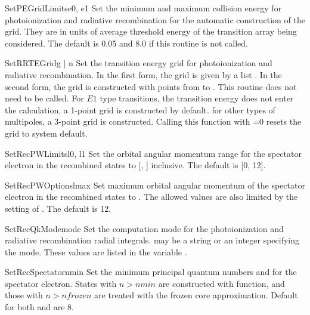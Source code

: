 \begin{fundesc}{SetPEGridLimits}{e0, e1}
Set the minimum and maximum collision energy for photoionization and radiative
recombination for the automatic construction of the grid. They are in units of
average threshold energy of the transition array being considered. The default
is 0.05 and 8.0 if this routine is not called.
\end{fundesc}

\begin{fundesc}{SetRRTEGrid}{g $\mid$ n}
Set the transition energy grid for photoionization and radiative recombination.
In the first form, the grid is given by a list . In the second form, the
grid is constructed with  points from  to . This routine
does not need to be called. For $E1$ type transitions, the transition energy
does not enter the calculation, a 1-point grid is constructed by default. for
other types of multipoles, a 3-point grid is constructed. Calling this function
with =0 resets the grid to system default.
\end{fundesc}

\begin{fundesc}{SetRecPWLimits}{l0, l1}
Set the orbital angular momentum range for the spectator electron in the
recombined states to [, ] inclusive. The default is [0, 12].
\end{fundesc}

\begin{fundesc}{SetRecPWOptions}{lmax}
Set maximum orbital angular momentum of the spectator electron in the
recombined states to . The allowed values are also limited by the
setting of . The default is 12.
\end{fundesc}

\begin{fundesc}{SetRecQkMode}{mode}
Set the computation mode for the photoionization and radiative recombination
radial integrals.  may be a string or an integer specifying the
mode. These values are listed in the variable .
\end{fundesc}

\begin{fundesc}{SetRecSpectator}{nmin}
Set the minimum principal quantum numbers  and  for the
spectator electron. States with $n > nmin$ are constructed with
 function, and those with $n > nfrozen$ are treated with the
frozen core approximation. Default for both  and  are 8.
\end{fundesc}

